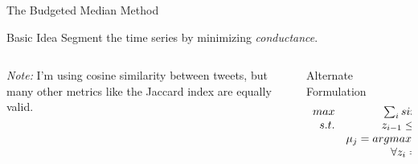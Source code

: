 \documentclass[compress]{beamer}
\begin{document}
\begin{frame}{The Budgeted Median Method}

\begin{block}{Basic Idea}
Segment the time series by minimizing \textit{conductance}.
\end{block}

\begin{columns}
\begin{column}[1]{3.5cm}
\textit{Note:} I'm using cosine similarity between tweets, but many other
metrics like the Jaccard index are equally valid.
\end{column}
\begin{column}[2]{5cm}
Alternate Formulation
\[
\begin{array}{r c l }
max & \sum_i sim(x_i, \mu_{z_i}) & \\
s.t. & z_{i-1} \leq z_i \leq z_{i+1} & \\
& \mu_j = argmax_{x_i} \sum_{k} sim(x_i, x_k) & \\
& \forall z_i = z_k = j & \\
\end{array}
\]

\end{column}
\end{columns}

\end{frame}
\end{document}
